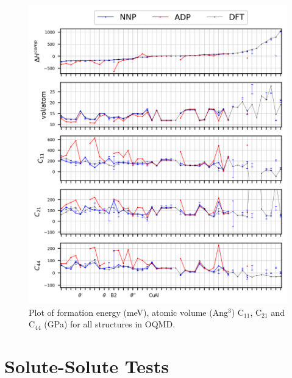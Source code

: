 \documentclass{article}
\begin{document}
\begin{figure}[H]%
\centering%
\includegraphics[width=540px]{./figures/matparam_stats1.png}%
\caption{Plot of formation energy (meV), atomic volume (Ang$^3$) C$_{11}$, C$_{21}$ and C$_{44}$ (GPa) for all structures in OQMD.}%
\end{figure}

%
\section{Solute{-}Solute Tests \newline%
}%
\label{sec:Solute{-}SoluteTests}%
\end{document}
